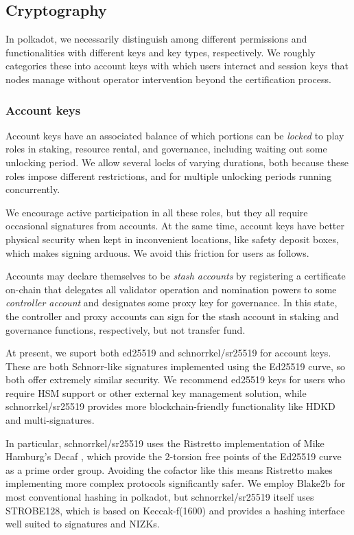 \subsection{Cryptography}\label{sec:crypto}

In polkadot, we necessarily distinguish among different permissions and functionalities with different keys and key types, respectively.  We roughly categories these into account keys with which users interact and session keys that nodes manage without operator intervention beyond the certification process.

\subsubsection{Account keys}

Account keys have an associated balance of which portions can be {\em locked} to play roles in staking, resource rental, and governance, including waiting out some unlocking period.  We allow several locks of varying durations, both because these roles impose different restrictions, and for multiple unlocking periods running concurrently. 

We encourage active participation in all these roles, but they all require occasional signatures from accounts.  At the same time, account keys have better physical security when kept in inconvenient locations, like safety deposit boxes, which makes signing arduous.  We avoid this friction for users as follows.

Accounts may declare themselves to be {\em stash accounts} by registering a certificate on-chain that delegates all validator operation and nomination powers to some {\em controller account} and designates some proxy key for governance.  In this state, the controller and proxy accounts can sign for the stash account in staking and governance functions, respectively, but not transfer fund. 

At present, we suport both ed25519 and schnorrkel/sr25519 for account keys.  These are both Schnorr-like signatures implemented using the Ed25519 curve, so both offer extremely similar security.  We recommend ed25519 keys for users who require HSM support or other external key management solution, while schnorrkel/sr25519 provides more blockchain-friendly functionality like HDKD and multi-signatures.  

In particular, schnorrkel/sr25519 uses the Ristretto implementation \cite{Ristretto} of Mike Hamburg's Decaf \cite[\S7]{Decaf}, which provide the 2-torsion free points of the Ed25519 curve as a prime order group.  Avoiding the cofactor like this means Ristretto makes implementing more complex protocols significantly safer.  We employ Blake2b for most conventional hashing in polkadot, but schnorrkel/sr25519 itself uses STROBE128, which is based on Keccak-f(1600) and provides a hashing interface well suited to signatures and NIZKs.

